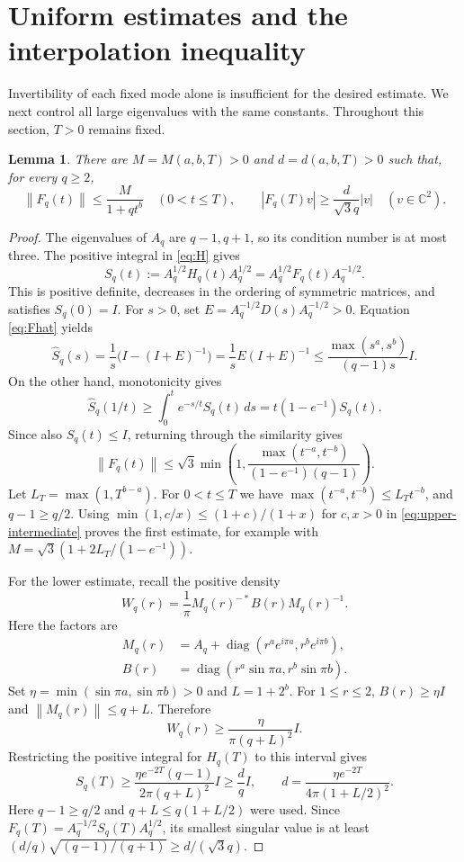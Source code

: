 \documentclass[11pt]{article}
\newtheorem{lemma}[theorem]{Lemma}
\newcommand{\C}{\mathbb C}
\newcommand{\Id}{I}
\newcommand{\norm}[1]{\left\lVert#1\right\rVert}
\newcommand{\abs}[1]{\left\lvert#1\right\rvert}
\begin{document}
\section{Uniform estimates and the interpolation inequality}\label{sec:uniform}
Invertibility of each fixed mode alone is insufficient for the desired
estimate. We next control all large eigenvalues with the same constants.
Throughout this section, $T>0$ remains fixed.

\begin{lemma}\label{lem:uniform}
There are $M=M(a,b,T)>0$ and $d=d(a,b,T)>0$ such that, for every $q\ge2$,
\begin{equation}\label{eq:uniform}
 \norm{F_q(t)}\le\frac{M}{1+qt^b}\quad(0<t\le T),\qquad
 \abs{F_q(T)v}\ge\frac{d}{\sqrt3q}\abs v\quad(v\in\C^2).
\end{equation}
\end{lemma}

\begin{proof}
The eigenvalues of $A_q$ are $q-1,q+1$, so its condition number is at most
three. The positive integral in \eqref{eq:H} gives
\[
 S_q(t):=A_q^{1/2}H_q(t)A_q^{1/2}
       =A_q^{1/2}F_q(t)A_q^{-1/2}.
\]
This is positive definite, decreases in the ordering of symmetric matrices,
and satisfies $S_q(0)=\Id$. For $s>0$, set
$E=A_q^{-1/2}D(s)A_q^{-1/2}>0$. Equation \eqref{eq:Fhat} yields
\[
 \widehat S_q(s)=\frac1s\bigl(\Id-(\Id+E)^{-1}\bigr)
 =\frac1sE(\Id+E)^{-1}
 \le\frac{\max(s^a,s^b)}{(q-1)s}\Id.
\]
On the other hand, monotonicity gives
\[
 \widehat S_q(1/t)\ge\int_0^te^{-s/t}S_q(t)\,ds
                 =t(1-e^{-1})S_q(t).
\]
Since also $S_q(t)\le\Id$, returning through the similarity gives
\begin{equation}\label{eq:upper-intermediate}
 \norm{F_q(t)}\le\sqrt3\min\left(1,
   \frac{\max(t^{-a},t^{-b})}{(1-e^{-1})(q-1)}\right).
\end{equation}
Let $L_T=\max(1,T^{b-a})$. For $0<t\le T$ we have
$\max(t^{-a},t^{-b})\le L_Tt^{-b}$, and $q-1\ge q/2$.
Using $\min(1,c/x)\le(1+c)/(1+x)$ for $c,x>0$ in
\eqref{eq:upper-intermediate} proves the first estimate, for example with
$M=\sqrt3(1+2L_T/(1-e^{-1}))$.

For the lower estimate, recall the positive density
\[
 W_q(r)=\frac1\pi M_q(r)^{-*}B(r)M_q(r)^{-1}.
\]
Here the factors are
\[
 \begin{aligned}
 M_q(r)&=A_q+\operatorname{diag}(r^ae^{i\pi a},r^be^{i\pi b}),\\
 B(r)&=\operatorname{diag}(r^a\sin\pi a,r^b\sin\pi b).
 \end{aligned}
\]
Set $\eta=\min(\sin\pi a,\sin\pi b)>0$ and $L=1+2^b$. For $1\le r\le2$,
$B(r)\ge\eta\Id$ and $\norm{M_q(r)}\le q+L$. Therefore
\[
 W_q(r)\ge\frac{\eta}{\pi(q+L)^2}\Id.
\]
Restricting the positive integral for $H_q(T)$ to this interval gives
\[
 S_q(T)\ge\frac{\eta e^{-2T}(q-1)}{2\pi(q+L)^2}\Id
         \ge\frac dq\Id,\qquad
 d=\frac{\eta e^{-2T}}{4\pi(1+L/2)^2}.
\]
Here $q-1\ge q/2$ and $q+L\le q(1+L/2)$ were used.
Since $F_q(T)=A_q^{-1/2}S_q(T)A_q^{1/2}$, its smallest singular value is
at least $(d/q)\sqrt{(q-1)/(q+1)}\ge d/(\sqrt3q)$.
\end{proof}
\end{document}
